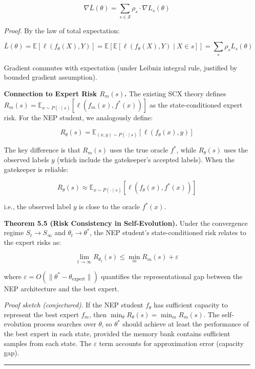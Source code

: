 \documentclass[
  12pt,
]{article}
\begin{document}
\[
\nabla \bar{L}(\theta) = \sum_{s \in \mathcal{S}} \rho_s \cdot \nabla L_s(\theta)
\]

\emph{Proof.} By the law of total expectation:

\[
\bar{L}(\theta) = \mathbb{E}[\ell(f_\theta(X), Y)] = \mathbb{E}[\mathbb{E}[\ell(f_\theta(X), Y) \mid X \in s]] = \sum_s \rho_s L_s(\theta)
\]

Gradient commutes with expectation (under Leibniz integral rule,
justified by bounded gradient assumption).

\textbf{Connection to Expert Risk \(R_m(s)\).} The existing SCX theory
defines
\(R_m(s) = \mathbb{E}_{x \sim P(\cdot \mid s)}[\ell(f_m(x), f^*(x))]\)
as the state-conditioned expert risk. For the NEP student, we
analogously define:

\[
R_\theta(s) = \mathbb{E}_{(x,y) \sim P(\cdot \mid s)}[\ell(f_\theta(x), y)]
\]

The key difference is that \(R_m(s)\) uses the true oracle \(f^*\),
while \(R_\theta(s)\) uses the observed labels \(y\) (which include the
gatekeeper's accepted labels). When the gatekeeper is reliable:

\[
R_\theta(s) \approx \mathbb{E}_{x \sim P(\cdot \mid s)}[\ell(f_\theta(x), f^*(x))]
\]

i.e., the observed label \(y\) is close to the oracle \(f^*(x)\).

\textbf{Theorem 5.5 (Risk Consistency in Self-Evolution).} Under the
convergence regime \(S_t \to S_\infty\) and \(\theta_t \to \theta^*\),
the NEP student's state-conditioned risk relates to the expert risks as:

\[
\lim_{t \to \infty} R_{\theta_t}(s) \leq \min_m R_m(s) + \varepsilon
\]

where \(\varepsilon = O(\|\theta^* - \theta_{\text{expert}}\|)\)
quantifies the representational gap between the NEP architecture and the
best expert.

\emph{Proof sketch (conjectured).} If the NEP student \(f_\theta\) has
sufficient capacity to represent the best expert \(f_m\), then
\(\min_\theta R_\theta(s) = \min_m R_m(s)\). The self-evolution process
searches over \(\theta\), so \(\theta^*\) should achieve at least the
performance of the best expert in each state, provided the memory bank
contains sufficient samples from each state. The \(\varepsilon\) term
accounts for approximation error (capacity gap).

\begin{center}\rule{0.5\linewidth}{0.5pt}\end{center}
\end{document}
